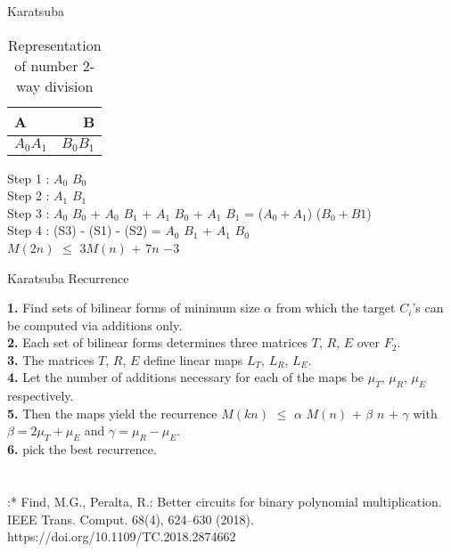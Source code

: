 \documentclass[12pt]{beamer}
\begin{document}
\begin{frame}{Karatsuba}

\begin{table}
\centering
\begin{tabular}{l|r}
A & B \\\hline
$A_0A_1$ & $B_0B_1$ \\
\end{tabular}
\caption{\label{tab:widgets} Representation of number 2-way division}
\end{table}

Step 1 : $A_0$ $B_0$\\
Step 2 : $A_1$ $B_1$ \\
Step 3 : $A_0$ $B_0$ + $A_0$ $B_1$ + $A_1$ $B_0$ + $A_1$ $B_1$ = ($A_0 + A_1$) ($B_0+B1$)\\
Step 4 : (S3) - (S1) - (S2) = $A_0$ $B_1$ + $A_1$ $B_0$\\

\vskip 1cm
$M(2n)$ $\leq$ $3M(n)$ + $7n$ $\num{-3}$

\end{frame}

\begin{frame}{Karatsuba Recurrence}

\textbf{1.} Find sets of bilinear forms of minimum size $\alpha$ from which the target $C_i$’s can be computed via additions only.\\
\textbf{2.} Each set of bilinear forms determines three matrices $T$, $R$, $E$ over $F_2$.\\
\textbf{3.} The matrices $T$, $R$, $E$ define linear maps $L_T$, $L_R$, $L_E$.\\
\textbf{4.} Let the number of additions necessary for each of the maps be $\mu_T$, $\mu_R$, $\mu_E$ respectively.\\
\textbf{5.} Then the maps yield the recurrence $M(kn)$ $\leq$ $\alpha$ $M(n)$ + $\beta$ $n$ + $\gamma$ with $\beta = 2\mu_T + \mu_E$ and $\gamma = \mu_R − \mu_E$.\\
\textbf{6.} pick the best recurrence.\\\\
\\
\vskip 1cm
\scriptsize :* Find, M.G., Peralta, R.: Better circuits for binary polynomial multiplication. IEEE Trans. Comput. 68(4), 624–630 (2018). https://doi.org/10.1109/TC.2018.2874662

\end{frame}
\end{document}
